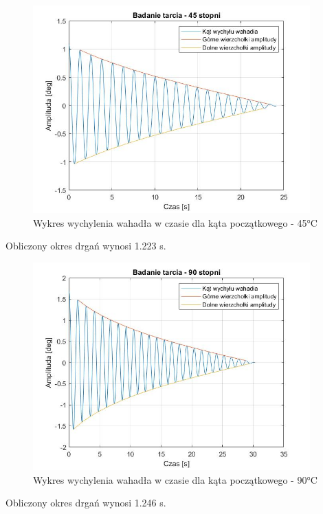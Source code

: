\documentclass[12pt]{article}
\numberwithin{equation}{section}
\begin{document}
\begin{figure}[H]
    \centering
    \includegraphics[width=0.95\textwidth]{wahadlo45.jpg}
    \caption{Wykres wychylenia wahadła w czasie dla kąta początkowego - 45°C}
    \label{fig:wahadlo45}
\end{figure}

Obliczony okres drgań wynosi 1.223 s.

\begin{figure}[H]
    \centering
    \includegraphics[width=0.95\textwidth]{wahadlo90.jpg}
    \caption{Wykres wychylenia wahadła w czasie dla kąta początkowego - 90°C}
    \label{fig:wahadlo90}
\end{figure}

Obliczony okres drgań wynosi 1.246 s.
\end{document}
